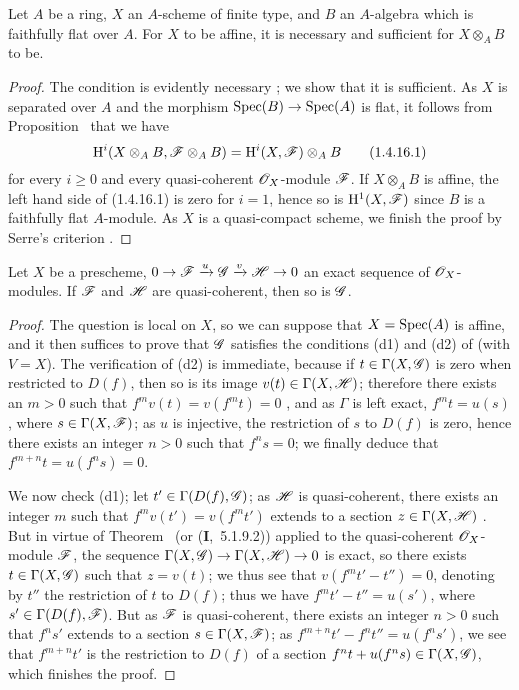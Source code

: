 \begin{corollary}[1.4.16]
\label{3.1.4.16}
Let $A$ be a ring, $X$ an $A$-scheme of finite type, and $B$ an $A$-algebra which is faithfully flat over $A$.
For $X$ to be affine, it is necessary and sufficient for $X\otimes_A B$ to be.
\end{corollary}

\begin{proof}
\label{proof-3.1.4.16}
The condition is evidently necessary ; we show that it is sufficient.
As $X$ is separated over $A$ and the morphism $\Spec(B)\to\Spec(A)$ is flat, it follows from Proposition~ that we have
\[
\label{3.1.4.16.1}
  \mathrm{H}^i(X\otimes_A B,\mathscr{F}\otimes_A B)=\mathrm{H}^i(X,\mathscr{F})\otimes_A B
  \tag{1.4.16.1}
\]
for every $i\geq 0$ and every quasi-coherent $\mathscr{O}_X$-module $\mathscr{F}$.
If $X\otimes_A B$ is affine, the left hand side of (1.4.16.1) is zero for $i=1$, hence so is $\mathrm{H}^1(X,\mathscr{F})$ since $B$ is a faithfully flat $A$-module.
As $X$ is a quasi-compact scheme, we finish the proof by Serre's criterion .
\end{proof}

\begin{proposition}[1.4.17]
\label{3.1.4.17}
Let $X$ be a prescheme, $0\to\sh{F}\xrightarrow{u}\sh{G}\xrightarrow{v}\sh{H}\to 0$ an exact sequence of $\mathscr{O}_X$-modules.
If $\mathscr{F}$ and $\mathscr{H}$ are quasi-coherent, then so is $\mathscr{G}$.
\end{proposition}

\begin{proof}
\label{proof-3.1.4.17}
The question is local on $X$, so we can suppose that $X=\operatorname{Spec}(A)$ is affine, and it then suffices to prove that $\mathscr{G}$ satisfies the conditions (d1) and (d2) of  (with $V=X$).
The verification of (d2) is immediate, because if $t\in\Gamma(X,\mathscr{G})$ is zero when restricted to $D(f)$, then so is its image $v(t)\in\Gamma(X,\mathscr{H})$; therefore there exists an $m>0$ such that $f^m v(t)=v(f^m t)=0$ , and as $\Gamma$ is left exact, $f^m t=u(s)$, where $s\in\Gamma(X,\mathscr{F})$; as $u$ is injective, the restriction of $s$ to $D(f)$ is zero, hence  there exists an integer $n>0$ such that $f^n s=0$; we finally deduce that $f^{m+n}t=u(f^n s)=0$.

We now check (d1); let $t'\in\Gamma(D(f),\mathscr{G})$; as $\mathscr{H}$ is quasi-coherent, there exists an integer $m$ such that $f^m v(t')=v(f^m t')$ extends to a section $z\in\Gamma(X,\mathscr{H})$ .
But in virtue of Theorem~ (or (\textbf{I},~5.1.9.2)) applied to the quasi-coherent $\mathscr{O}_X$-module $\mathscr{F}$, the sequence $\Gamma(X,\sh{G})\to\Gamma(X,\sh{H})\to 0$ is exact, so there exists $t\in\Gamma(X,\mathscr{G})$ such that $z=v(t)$; we thus see that $v(f^m t'-t'')=0$, denoting by $t''$ the restriction of $t$ to $D(f)$; thus we have $f^m t'-t''=u(s')$, where $s'\in\Gamma(D(f),\mathscr{F})$.
But as $\mathscr{F}$ is quasi-coherent, there exists an integer $n>0$ such that $f^n s'$ extends to a section $s\in\Gamma(X,\mathscr{F})$; as $f^{m+n}t'-f^n t''=u(f^n s')$, we see that $f^{m+n}t'$ is the restriction to $D(f)$ of a section $f^n t+u(f^n s)\in\Gamma(X,\mathscr{G})$, which finishes the proof.
\end{proof}

